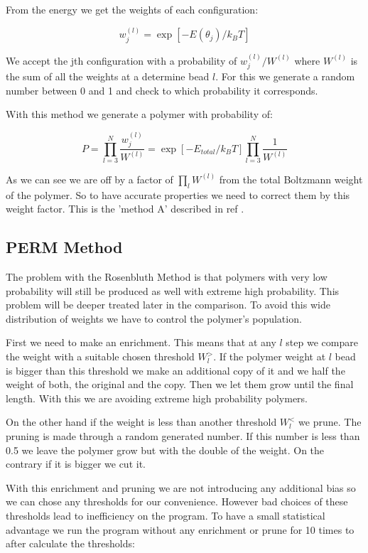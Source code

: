 \documentclass[aps,prl,reprint,groupedaddress]{revtex4-1}
\begin{document}
From the energy we get the weights of each configuration:

\begin{equation}
	w_j^{(l)} = \exp[-E(\theta_j)/k_BT]
\end{equation}

We accept the jth configuration with a probability of $w_j^{(l)}/W^{(l)}$ where $W^{(l)}$ is the sum of all the weights at a determine bead $l$. For this we generate a random number between 0 and 1 and check to which probability it corresponds. 

With this method we generate a polymer with probability of:

\begin{equation}
	P = \prod_{l=3}^N \frac{w_j^{(l)}}{W^{(l)}}= \exp[-E_{total}/k_BT]\prod_{l=3}^N \frac{1}{W^{(l)}}
\end{equation}

As we can see we are off by a factor of $\prod_lW^{(l)}$ from the total Boltzmann weight of the polymer. So to have accurate properties we need to correct them by this weight factor. This is the 'method A' described in ref \cite{Josbook}.

\subsection{PERM Method}
The problem with the Rosenbluth Method is that polymers with very low probability will still be produced as well with extreme high probability. This problem will be deeper treated later in the comparison. To avoid this wide distribution of weights we have to control the polymer's population.

First we need to make an enrichment. This means that at any $l$ step we compare the weight with a suitable chosen threshold $W_l^>$. If the polymer weight at $l$ bead is bigger than this threshold we make an additional copy of it and we half the weight of both, the original and the copy. Then we let them grow until the final length. With this we are avoiding extreme high probability polymers. 

On the other hand if the weight is less than another threshold $W_l^<$ we prune. The pruning is made through a random generated number. If this number is less than 0.5 we leave the polymer grow but with the double of the weight. On the contrary if it is bigger we cut it. 

With this enrichment and pruning we are not introducing any additional bias so we can chose any thresholds for our convenience. However bad choices of these thresholds lead to inefficiency on the program. To have a small statistical advantage we run the program without any enrichment or prune for 10 times to after calculate the thresholds: 
\end{document}

